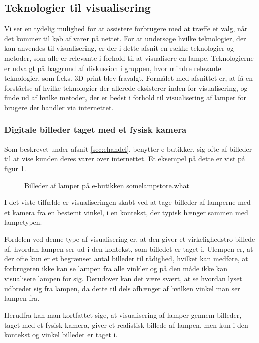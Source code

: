 \subsection{Teknologier til visualisering}
Vi ser en tydelig mulighed for at assistere forbrugere med at træffe et valg, når det kommer til køb af varer på nettet. For at undersøge hvilke teknologier, der kan anvendes til visualisering, er der i dette afsnit en række teknologier og metoder, som alle er relevante i forhold til at visualisere en lampe. Teknologierne er udvalgt på baggrund af diskussion i gruppen, hvor mindre relevante teknologier, som f.eks. 3D-print blev fravalgt. Formålet med afsnittet er, at få en forståelse af hvilke teknologier der allerede eksisterer inden for visualisering, og finde ud af hvilke metoder, der er bedst i forhold til visualisering af lamper for brugere der handler via internettet.

\subsubsection{Digitale billeder taget med et fysisk kamera}
Som beskrevet under afsnit \ref{sec:ehandel}, benytter e-butikker, sig ofte af billeder til at vise kunden deres varer over internettet. Et eksempel på dette er vist på figur \ref{fig:e_handel_lampebilleder}.

\begin{figure}[H]
    \centering
    \fbox{\rule{\textwidth}{5cm}}
    \caption{Billeder af lamper på e-butikken somelampstore.what}
    \label{fig:e_handel_lampebilleder}
\end{figure} 

I det viste tilfælde er visualiseringen skabt ved at tage billeder af lamperne med et kamera fra en bestemt vinkel, i en kontekst, der typisk hænger sammen med lampetypen. 

Fordelen ved denne type af visualisering er, at den giver et virkelighedstro billede af, hvordan lampen ser ud i den kontekst, som billedet er taget i. Ulempen er, at der ofte kun er et begrænset antal billeder til rådighed, hvilket kan medføre, at forbrugeren ikke kan se lampen fra alle vinkler og på den måde ikke kan visualisere lampen for sig. Derudover kan det være svært, at se hvordan lyset udbreder sig fra lampen, da dette til dels afhænger af hvilken vinkel man ser lampen fra. 

Herudfra kan man kortfattet sige, at visualisering af lamper gennem billeder, taget med et fysisk kamera, giver et realistisk billede af lampen, men kun i den kontekst og vinkel billedet er taget i. 

